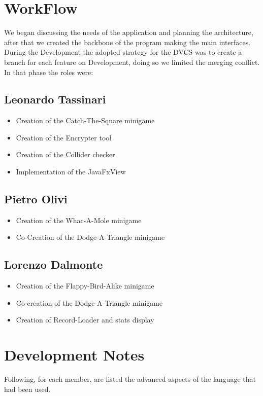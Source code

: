\documentclass[a4paper,12pt]{report}
\begin{document}
 \section{WorkFlow}
 We began discussing the needs of the application and planning the architecture, after that we created the backbone of the program making the main interfaces.
 During the Development the adopted strategy for the DVCS was to create a branch for each feature on Development, doing so we limited the merging conflict.
 In that phase the roles were:
\subsection*{Leonardo Tassinari}
\begin{itemize}
	\item Creation of the Catch-The-Square minigame
	\item Creation of the Encrypter tool
	\item Creation of the Collider checker
	\item Implementation of the JavaFxView
\end{itemize}

\subsection*{Pietro Olivi}
\begin{itemize}
	\item Creation of the Whac-A-Mole minigame
	\item Co-Creation of the Dodge-A-Triangle minigame
\end{itemize}

\subsection*{Lorenzo Dalmonte}
\begin{itemize}
	\item Creation of the Flappy-Bird-Alike minigame
	\item Co-creation of the Dodge-A-Triangle minigame
	\item Creation of Record-Loader and stats display
\end{itemize}

\section{Development Notes}
Following, for each member, are listed the advanced aspects of the language that had been used.
\end{document}

